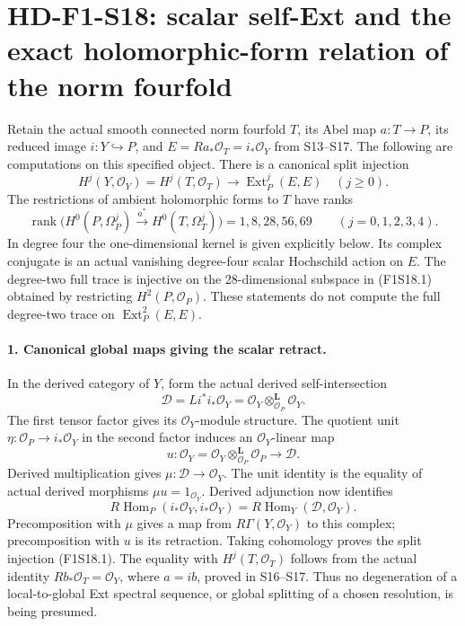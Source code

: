 \section[HD-F1-S18: norm-fourfold scalar action]{HD-F1-S18: scalar self-Ext and the exact holomorphic-form relation of the norm fourfold}
\label{sec:f1-norm-fourfold-scalar-action}

Retain the actual smooth connected norm fourfold $T$, its Abel map
$a:T\to P$, its reduced image $i:Y\hookrightarrow P$, and
$E=Ra_*\mathcal O_T=i_*\mathcal O_Y$ from S13--S17.
The following are computations on this specified object.
There is a canonical split injection
\[
 H^j(Y,\mathcal O_Y)=H^j(T,\mathcal O_T)
               \longrightarrow\operatorname{Ext}^j_P(E,E)
                       \quad(j\geq0).
 \tag{F1S18.1}
\]
The restrictions of ambient holomorphic forms to $T$ have ranks
\[
 \operatorname{rank}\bigl(H^0(P,\Omega_P^j)
                \xrightarrow{a^*}H^0(T,\Omega_T^j)\bigr)
                      =1,8,28,56,69\qquad(j=0,1,2,3,4).
 \tag{F1S18.2}
\]
In degree four the one-dimensional kernel is given explicitly below.
Its complex conjugate is an actual vanishing degree-four scalar
Hochschild action on $E$. The degree-two full trace is injective on
the 28-dimensional subspace in (F1S18.1) obtained by restricting
$H^2(P,\mathcal O_P)$. These statements do not compute the full
degree-two trace on $\operatorname{Ext}^2_P(E,E)$.

\paragraph{1. Canonical global maps giving the scalar retract.}
In the derived category of $Y$, form the actual derived self-intersection
\[
 \mathcal D=Li^*i_*\mathcal O_Y
          =\mathcal O_Y\otimes^{\mathbf L}_{\mathcal O_P}\mathcal O_Y.
\]
The first tensor factor gives its $\mathcal O_Y$-module structure.
The quotient unit $\eta:\mathcal O_P\to i_*\mathcal O_Y$ in the
second factor induces an $\mathcal O_Y$-linear map
\[
 u:\mathcal O_Y=\mathcal O_Y\otimes^{\mathbf L}_{\mathcal O_P}
                         \mathcal O_P\longrightarrow\mathcal D.
\]
Derived multiplication gives $\mu:\mathcal D\to\mathcal O_Y$.
The unit identity is the equality of actual derived morphisms
$\mu u=1_{\mathcal O_Y}$.
Derived adjunction now identifies
\[
 R\operatorname{Hom}_P(i_*\mathcal O_Y,i_*\mathcal O_Y)
       =R\operatorname{Hom}_Y(\mathcal D,\mathcal O_Y).
\]
Precomposition with $\mu$ gives a map from
$R\Gamma(Y,\mathcal O_Y)$ to this complex; precomposition with
$u$ is its retraction. Taking cohomology proves the split injection
(F1S18.1). The equality with $H^j(T,\mathcal O_T)$ follows from
the actual identity $Rb_*\mathcal O_T=\mathcal O_Y$, where
$a=ib$, proved in S16--S17. Thus no degeneration of a local-to-global
Ext spectral sequence, or global splitting of a chosen resolution,
is being presumed.

